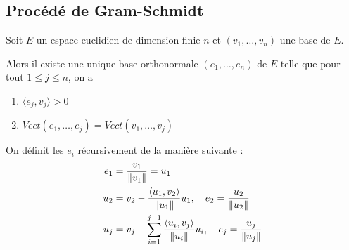 \documentclass[a4paper,12pt]{article}
\begin{document}
\subsection{Procédé de Gram-Schmidt}

\begin{theoreme}{}{}
    Soit $E$ un espace euclidien de dimension finie $n$ et $(v_1, \dots, v_n)$ une base de $E$.

    Alors il existe une unique base orthonormale $(e_1, \dots, e_n)$ de $E$ telle que pour tout $1 \leq j \leq n$, on a
    \begin{enumerate}
        \item $\langle e_j, v_j \rangle > 0$
        \item $Vect(e_1, \dots, e_j) = Vect(v_1, \dots, v_j)$
    \end{enumerate}
\end{theoreme}

\begin{demonstration}
    On définit les $e_i$ récursivement de la manière suivante :
\begin{align*}
    e_1 &= \frac{v_1}{\left\lVert v_1\right\rVert} = u_1 \\
    u_2 &= v_2 - \dfrac{\langle u_1, v_2 \rangle}{\left\lVert u_1\right\rVert} u_1, \quad e_2 = \frac{u_2}{\left\lVert u_2\right\rVert} \\
    u_j &= v_j - \sum_{i=1}^{j-1} \dfrac{\langle u_i, v_j \rangle}{\left\lVert u_i\right\rVert} u_i, \quad e_j = \frac{u_j}{\left\lVert u_j\right\rVert}
\end{align*}
\end{demonstration}
\end{document}
